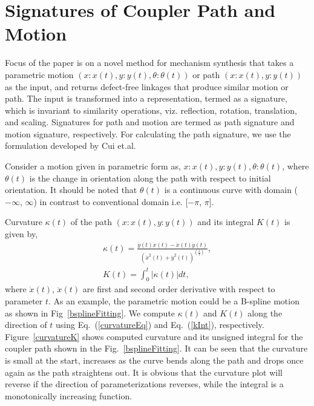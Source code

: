 \documentclass[twocolumn,10pt]{asme2ej}
\newcommand{\req}[1]{(\ref{#1})}
\begin{document}
\section{Signatures of Coupler Path and Motion}\label{sec_sign}
Focus of the paper is on a novel method for mechanism synthesis that takes a parametric motion $(x:x(t), y:y(t), \theta:\theta(t))$ or path $(x:x(t), y:y(t))$ as the input, and returns defect-free linkages that produce similar motion or path.
The input is transformed into a representation, termed as a signature, which is invariant to similarity operations, viz. reflection, rotation, translation, and scaling.
Signatures for path and motion are termed as path signature and motion signature, respectively.
For calculating the path signature, we use the formulation developed by Cui et.al\cite{cui2009}.

Consider a motion given in parametric form as, $x:x(t), y:y(t), \theta:\theta(t)$, where $\theta(t)$ is the change in orientation along the path with respect to initial orientation.
It should be noted that $\theta(t)$ is a continuous curve with domain ($-\infty$, $\infty$) in contrast to conventional domain i.e. [$-\pi$, $\pi$].

Curvature $\kappa(t)$ of the path $(x:x(t), y:y(t))$ and its integral $K(t)$ is given by,
\begin{eqnarray}
  \kappa(t) = \frac{\ddot{y}(t)\dot{x}(t) - \ddot{x}(t)\dot{y}(t)}{{(\dot{x}^2(t) + \dot{y}^2(t))}^{(\frac 32)}}, \label{curvatureEq}\\
  K(t) = \int^{t}_0 |\kappa(t)|dt \label{kInt},
\end{eqnarray}
where $\dot{x}(t)$, $\ddot{x}(t)$ are first and second order derivative with respect to parameter $t$.
As an example, the parametric motion could be a B-spline motion as shown in Fig~\ref{bsplineFitting}.
We compute $\kappa(t)$ and $K(t)$ along the direction of $t$ using Eq.~\req{curvatureEq} and Eq.~\req{kInt}, respectively.
Figure~\ref{curvatureK} shows computed curvature and its unsigned integral for the coupler path shown in the Fig.~\ref{bsplineFitting}.
It can be seen that the curvature is small at the start, increases as the curve bends along the path and drops once again as the path straightens out. It is obvious that the curvature plot will reverse if the direction of parameterizations reverses, while the integral is a monotonically increasing function.
\end{document}
